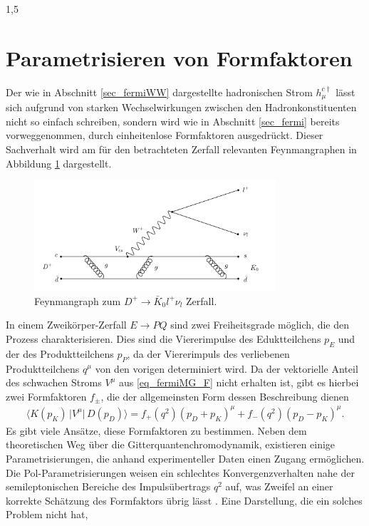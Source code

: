 \documentclass[11pt,a4paper,twoside]{report}
\begin{document}
\begin{spacing}{1,5}
\section{Parametrisieren von Formfaktoren}
Der wie in Abschnitt \ref{sec_fermiWW} dargestellte hadronischen Strom $h_\mu^{c\dagger}$ lässt sich aufgrund von starken Wechselwirkungen zwischen den 
Hadronkonstituenten nicht so einfach schreiben, sondern wird wie in Abschnitt \ref{sec_fermi} bereits vorweggenommen, durch einheitenlose Formfaktoren 
ausgedrückt\cite{KimPham}. Dieser Sachverhalt wird am für den betrachteten Zerfall relevanten Feynmangraphen in Abbildung \ref{pic_Dfeyn} dargestellt.
\begin{figure}[H]
\includegraphics[width=0.8\textwidth]{Abbildungen/DFeyn.png}
\caption{Feynmangraph zum $D^+\rightarrow \bar K_0 l^+ \nu_l$ Zerfall.}
\label{pic_Dfeyn}
\end{figure}
\noindent
In einem Zweikörper-Zerfall $E\rightarrow PQ$ sind zwei Freiheitsgrade möglich, die den Prozess charakterisieren. Dies sind die Viererimpulse des Eduktteilchens
$p_E$ und der des Produktteilchens $p_P$, da der Viererimpuls des verliebenen Produktteilchens $q^\mu$ von den vorigen determiniert wird. Da der vektorielle 
Anteil des schwachen Stroms $V^\mu$ aus \eqref{eq_fermiMG_F} nicht erhalten ist, gibt es hierbei zwei Formfaktoren $f_\pm$, die der allgemeinsten Form
dessen Beschreibung dienen
\begin{align}
 \big\langle K(p_K)\,\big|V^\mu\big|\, D(p_D)\big\rangle = f_+(q^2)(p_D+p_K)^\mu + f_-(q^2)(p_D-p_K)^\mu.
\end{align}
Es gibt viele Ansätze, diese Formfaktoren zu bestimmen. Neben dem theoretischen Weg über die Gitterquantenchromodynamik, existieren einige Parametrisierungen,
die anhand experimenteller Daten einen Zugang ermöglichen. Die Pol-Parametrisierungen weisen ein schlechtes Konvergenzverhalten nahe der semileptonischen Bereiche
des Impulsübertrags $q^2$ auf, was Zweifel an einer korrekte Schätzung des Formfaktors übrig lässt \cite{PhysRev_Data}. Eine Darstellung, die ein solches Problem nicht hat,

\end{spacing}
\end{document}
